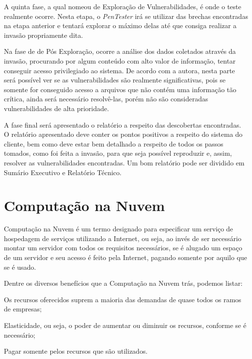 A quinta fase, a qual  nomeou de Exploração de Vulnerabilidades, é onde o teste realmente ocorre. Nesta etapa, o {\em PenTester} irá se utilizar das brechas encontradas na etapa anterior e tentará explorar o máximo delas até que consiga realizar a invasão propriamente dita.

Na fase de de Pós Exploração, ocorre a análise dos dados coletados através da invasão, procurando por algum conteúdo com alto valor de informação, tentar conseguir acesso privilegiado ao sistema. De acordo com a autora, nesta parte será possível ver se as vulnerabilidades são realmente significativas, pois se somente for conseguido acesso a arquivos que não contém uma informação tão crítica, ainda será necessário resolvê-las, porém não são consideradas vulnerabilidades de alta prioridade.

A fase final será apresentado o relatório a respeito das descobertas encontradas. O relatório apresentado deve conter os pontos positivos a respeito do sistema do cliente, bem como deve estar bem detalhado a respeito de todos os passos tomados, como foi feita a invasão, para que seja possível reproduzir e, assim, resolver as vulnerabilidades encontradas. Um bom relatório pode ser dividido em Sumário Executivo e Relatório Técnico.

\section{Computação na Nuvem}
\label{s.cloudcomputing}

Computação na Nuvem é um termo designado para especificar um serviço de hospedagem de serviços utilizando a Internet, ou seja, ao invés de ser necessário montar um servidor com todos os requisitos necessários, se é alugado um espaço de um servidor e seu acesso é feito pela Internet, pagando somente por aquilo que se é usado.

Dentre os diversos benefícios que a Computação na Nuvem trás, podemos listar:

\begin{alineas}
  \item Os recursos oferecidos suprem a maioria das demandas de quase todos os ramos de empresas;
  \item Elasticidade, ou seja, o poder de aumentar ou diminuir os recursos, conforme se é necessário;
  \item Pagar somente pelos recursos que são utilizados.
\end{alineas}

